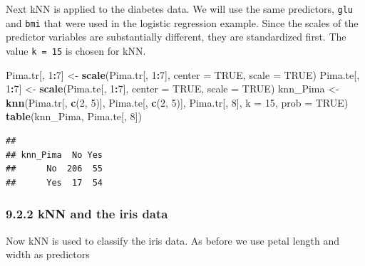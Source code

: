 \documentclass[]{article}
\newenvironment{Shaded}{\begin{snugshade}}{\end{snugshade}}
\newcommand{\KeywordTok}[1]{\textcolor[rgb]{0.13,0.29,0.53}{\textbf{#1}}}
\newcommand{\DataTypeTok}[1]{\textcolor[rgb]{0.13,0.29,0.53}{#1}}
\newcommand{\DecValTok}[1]{\textcolor[rgb]{0.00,0.00,0.81}{#1}}
\newcommand{\StringTok}[1]{\textcolor[rgb]{0.31,0.60,0.02}{#1}}
\newcommand{\OtherTok}[1]{\textcolor[rgb]{0.56,0.35,0.01}{#1}}
\newcommand{\OperatorTok}[1]{\textcolor[rgb]{0.81,0.36,0.00}{\textbf{#1}}}
\newcommand{\NormalTok}[1]{#1}
\begin{document}
Next kNN is applied to the diabetes data. We will use the same
predictors, \texttt{glu} and \texttt{bmi} that were used in the logistic
regression example. Since the scales of the predictor variables are
substantially different, they are standardized first. The value
\texttt{k\ =\ 15} is chosen for kNN.

\begin{Shaded}
\begin{Highlighting}[]
\NormalTok{Pima.tr[, }\DecValTok{1}\OperatorTok{:}\DecValTok{7}\NormalTok{] <-}\StringTok{ }\KeywordTok{scale}\NormalTok{(Pima.tr[, }\DecValTok{1}\OperatorTok{:}\DecValTok{7}\NormalTok{], }\DataTypeTok{center =} \OtherTok{TRUE}\NormalTok{, }\DataTypeTok{scale =} \OtherTok{TRUE}\NormalTok{)}
\NormalTok{Pima.te[, }\DecValTok{1}\OperatorTok{:}\DecValTok{7}\NormalTok{] <-}\StringTok{ }\KeywordTok{scale}\NormalTok{(Pima.te[, }\DecValTok{1}\OperatorTok{:}\DecValTok{7}\NormalTok{], }\DataTypeTok{center =} \OtherTok{TRUE}\NormalTok{, }\DataTypeTok{scale =} \OtherTok{TRUE}\NormalTok{)}
\NormalTok{knn_Pima <-}\StringTok{ }\KeywordTok{knn}\NormalTok{(Pima.tr[, }\KeywordTok{c}\NormalTok{(}\DecValTok{2}\NormalTok{, }\DecValTok{5}\NormalTok{)], Pima.te[, }\KeywordTok{c}\NormalTok{(}\DecValTok{2}\NormalTok{, }\DecValTok{5}\NormalTok{)], Pima.tr[, }\DecValTok{8}\NormalTok{], }\DataTypeTok{k =} \DecValTok{15}\NormalTok{, }\DataTypeTok{prob =} \OtherTok{TRUE}\NormalTok{)}
\KeywordTok{table}\NormalTok{(knn_Pima, Pima.te[, }\DecValTok{8}\NormalTok{])}
\end{Highlighting}
\end{Shaded}

\begin{verbatim}
##         
## knn_Pima  No Yes
##      No  206  55
##      Yes  17  54
\end{verbatim}

\subsubsection{9.2.2 kNN and the iris data}\label{knn-and-the-iris-data}

Now kNN is used to classify the iris data. As before we use petal length
and width as predictors

\begin{Shaded}
\end{Shaded}
\end{document}
